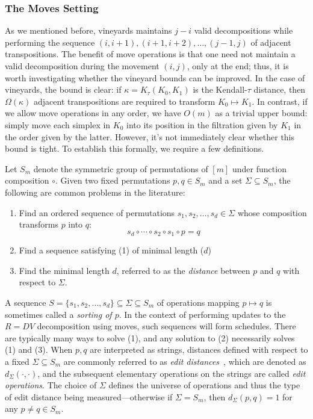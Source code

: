 \documentclass{siamart190516}
\newcommand\sbullet[1][.5]{\mathbin{\vcenter{\hbox{\scalebox{#1}{$\bullet$}}}}}
\begin{document}
\subsubsection{The Moves Setting} 
As we mentioned before, vineyards maintains 
$j-i$ valid decompositions while 
performing the sequence 
$(i,i+1), (i+1,i+2), \ldots, (j-1,j)$
of adjacent transpositions. 
The benefit of move operations is that one need not maintain a valid decomposition during the movement $(i,j)$, only at the end; thus, it is worth investigating whether the vineyard bounds can be improved. 
In the case of vineyards, the bound is clear: 
if $\kappa = K_\tau(K_0, K_1)$ is the Kendall-$\tau$ distance, then $\Omega(\kappa)$ adjacent transpositions are required to transform $K_0 \mapsto K_1$. 
In contrast, if we allow move operations in any order, we have $O(m)$ as a trivial upper bound: simply move each simplex in $K_0$ into its position in the filtration given by $K_1$ in the order given by the latter. However, it's not immediately clear whether this bound is tight. To establish this formally, we require a few definitions.

Let $S_m$ denote the symmetric group  of   permutations of  $[m]$ under function composition $\circ$.
Given two fixed permutations $p, q \in S_m$ and a set $\Sigma \subseteq S_m$,  the following 
are common problems in the literature:
\begin{enumerate}
	\item Find an ordered sequence of permutations $s_1, s_2, \dots, s_d \in \Sigma$ whose composition transforms $p$ into $q$:
	\begin{displaymath}
		s_d \circ \cdots \circ s_2 \circ s_1 \circ p = q
	\end{displaymath}
	\item Find a sequence satisfying (1) of minimal length ($d$)
	\item Find the minimal length $d$, referred to as the \emph{distance} between $p$ and $q$ with respect to $\Sigma$. 
\end{enumerate}
A sequence $S = \{s_1, s_2, \dots, s_d\} \subseteq \Sigma \subseteq S_m$ of operations mapping $p \mapsto q$ is sometimes called a \emph{sorting of $p$}.
In the context of performing updates to the $R = D V$ decomposition using moves,  such sequences will form schedules. 
There are typically many ways to solve (1), and any solution to (2) necessarily solves (1) and (3). When $p, q$ are interpreted as strings, distances defined with respect to a fixed $\Sigma \subseteq S_m$ are commonly referred to as \emph{edit distances}~\cite{labarre2013lower}, which are denoted as $d_\Sigma(\cdot, \cdot)$, and the subsequent elementary operations on the strings are called \emph{edit operations}. 
The choice of $\Sigma$ defines the universe of operations and thus the type of edit distance being measured---otherwise if $\Sigma = S_m$, then $d_\Sigma(p, q) = 1$ for any $p\neq  q \in S_m$.
\end{document}
